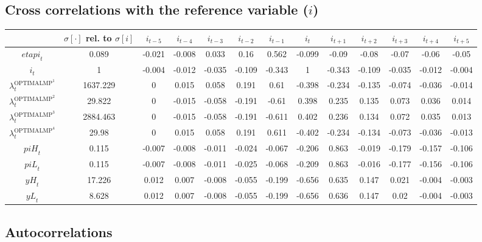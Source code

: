 \subsection{Cross correlations with the reference variable ($i$)}

\begin{tabular}{c|c|c|c|c|c|c|c|c|c|c|c|c|}
  & $\sigma[\cdot]$ rel. to $\sigma[i]$ & $i_{t-5}$ & $i_{t-4}$ & $i_{t-3}$ & $i_{t-2}$ & $i_{t-1}$ & $i_{t}$ & $i_{t+1}$ & $i_{t+2}$ & $i_{t+3}$ & $i_{t+4}$ & $i_{t+5}$\\
\hline
${e\!t\!a\!p\!i}_{t}$ & 0.089 & -0.021 & -0.008 & 0.033 & 0.16 & 0.562 & -0.099 & -0.09 & -0.08 & -0.07 & -0.06 & -0.05 \\
$i_{t}$ & 1 & -0.004 & -0.012 & -0.035 & -0.109 & -0.343 & 1 & -0.343 & -0.109 & -0.035 & -0.012 & -0.004 \\
$\lambda^{\mathrm{OPTIMALMP}^{\mathrm{1}}}_{t}$ & 1637.229 & 0 & 0.015 & 0.058 & 0.191 & 0.61 & -0.398 & -0.234 & -0.135 & -0.074 & -0.036 & -0.014 \\
$\lambda^{\mathrm{OPTIMALMP}^{\mathrm{2}}}_{t}$ & 29.822 & 0 & -0.015 & -0.058 & -0.191 & -0.61 & 0.398 & 0.235 & 0.135 & 0.073 & 0.036 & 0.014 \\
$\lambda^{\mathrm{OPTIMALMP}^{\mathrm{3}}}_{t}$ & 2884.463 & 0 & -0.015 & -0.058 & -0.191 & -0.611 & 0.402 & 0.236 & 0.134 & 0.072 & 0.035 & 0.013 \\
$\lambda^{\mathrm{OPTIMALMP}^{\mathrm{4}}}_{t}$ & 29.98 & 0 & 0.015 & 0.058 & 0.191 & 0.611 & -0.402 & -0.234 & -0.134 & -0.073 & -0.036 & -0.013 \\
${p\!i\!H}_{t}$ & 0.115 & -0.007 & -0.008 & -0.011 & -0.024 & -0.067 & -0.206 & 0.863 & -0.019 & -0.179 & -0.157 & -0.106 \\
${p\!i\!L}_{t}$ & 0.115 & -0.007 & -0.008 & -0.011 & -0.025 & -0.068 & -0.209 & 0.863 & -0.016 & -0.177 & -0.156 & -0.106 \\
${y\!H}_{t}$ & 17.226 & 0.012 & 0.007 & -0.008 & -0.055 & -0.199 & -0.656 & 0.635 & 0.147 & 0.021 & -0.004 & -0.003 \\
${y\!L}_{t}$ & 8.628 & 0.012 & 0.007 & -0.008 & -0.055 & -0.199 & -0.656 & 0.636 & 0.147 & 0.02 & -0.004 & -0.003 \\
\hline
\end{tabular}


\subsection{Autocorrelations}

